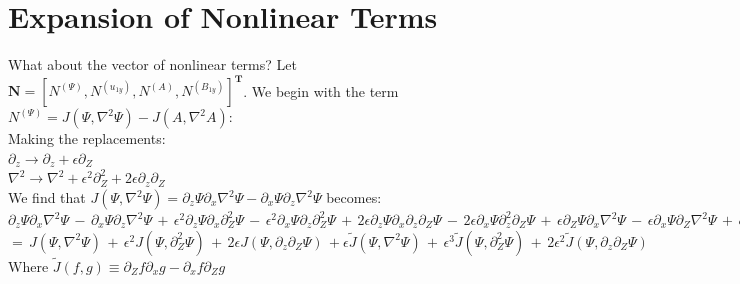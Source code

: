 \documentclass[letterpaper,12pt]{article}
\begin{document}
\section*{Expansion of Nonlinear Terms}

What about the vector of nonlinear terms? Let $\mathbf{N} = \left[N^{\left(\Psi\right)}, N^{\left(u_{1y}\right)}, N^{\left(A\right)}, N^{\left(B_{1y}\right)} \right]^\mathbf{T}$. We begin with the term $N^{\left(\Psi\right)} = J\left(\Psi, \nabla^2\Psi\right) - J\left(A, \nabla^2A\right)$: \\

Making the replacements: \\

$\partial_z \to \partial_z + \epsilon\partial_Z$ \\

$\nabla^2 \to \nabla^2 + \epsilon^2\partial_Z^2 + 2\epsilon\partial_z\partial_Z$ \\

We find that $J\left(\Psi, \nabla^2\Psi\right) = \partial_z\Psi\partial_x\nabla^2\Psi - \partial_x\Psi\partial_z\nabla^2\Psi$ becomes: \\

$\partial_z\Psi\partial_x\nabla^2\Psi \, - \, \partial_x\Psi\partial_z\nabla^2\Psi \, + \, \epsilon^2\partial_z\Psi\partial_x\partial_Z^2\Psi \, - \, \epsilon^2\partial_x\Psi\partial_z\partial_Z^2\Psi \, + \, 2\epsilon\partial_z\Psi\partial_x\partial_z\partial_Z\Psi \, - \, 2\epsilon\partial_x\Psi\partial_z^2\partial_Z\Psi \, + \, \epsilon\partial_Z\Psi\partial_x\nabla^2\Psi \, - \, \epsilon\partial_x\Psi\partial_Z\nabla^2\Psi \, + \, \epsilon^3\partial_Z\Psi\partial_x\partial_Z^2\Psi \, - \, \epsilon^3\partial_x\Psi\partial_Z^3\Psi \, + \, 2\epsilon^2\partial_Z\Psi\partial_x\partial_z\partial_Z\Psi \, - \, 2\epsilon^2\partial_x\Psi\partial_z\partial_Z^2\Psi$ \\

$= \, J\left(\Psi, \nabla^2\Psi\right) \, + \, \epsilon^2J\left(\Psi, \partial_Z^2\Psi\right) \, + \, 2\epsilon J\left(\Psi, \partial_z\partial_Z\Psi\right) \, + \epsilon\widetilde{J}\left(\Psi, \nabla^2\Psi\right) \, + \, \epsilon^3\widetilde{J}\left(\Psi, \partial_Z^2\Psi\right) \, + \, 2\epsilon^2\widetilde{J}\left(\Psi, \partial_z\partial_Z\Psi\right)$ \\

Where $\widetilde{J}\left(f, g\right) \equiv \partial_Z f \partial_x g - \partial_x f \partial_Z g$ \\
\end{document}
